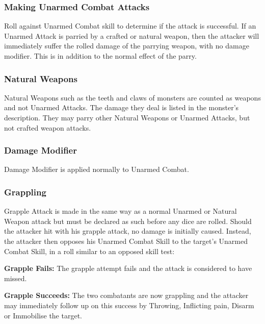 \subsubsection{Making Unarmed Combat Attacks}
Roll against Unarmed Combat skill to determine if the attack is successful. If an Unarmed Attack is parried by a crafted or natural weapon, then the attacker will immediately suffer the rolled damage of the parrying weapon, with no damage modifier. This is in addition to the normal effect of the parry. 

\subsubsection{Natural Weapons}
Natural Weapons such as the teeth and claws of monsters are counted as weapons and not Unarmed Attacks. The damage they deal is listed in the monster’s description. They may parry other Natural Weapons or Unarmed Attacks, but not crafted weapon attacks.

\subsubsection{Damage Modifier}
Damage Modifier is applied normally to Unarmed Combat.

\subsubsection{Grappling}
Grapple Attack is made in the same way as a normal Unarmed or Natural Weapon attack but must be declared as such before any dice are rolled. Should the attacker hit with his grapple attack, no damage is initially caused. Instead, the attacker then opposes his Unarmed Combat Skill to the target’s Unarmed Combat Skill, in a roll similar to an opposed skill test:
\begin{rpg-list}
\item \textbf{Grapple Fails:} The grapple attempt fails and the attack is considered to have missed. 
\item \textbf{Grapple Succeeds:} The two combatants are now grappling and the attacker may immediately follow up on this success by Throwing, Inflicting pain, Disarm or Immobilise the target.
\end{rpg-list}



